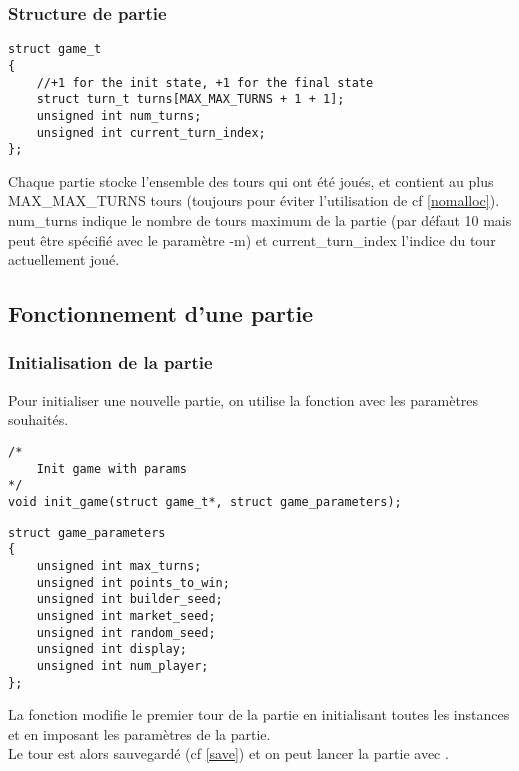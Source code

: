 \subsubsection*{Structure de partie}

\begin{lstlisting}[frame=single, caption={Implémentation de la structure game\_t}]
struct game_t
{
    //+1 for the init state, +1 for the final state
    struct turn_t turns[MAX_MAX_TURNS + 1 + 1]; 
    unsigned int num_turns;
    unsigned int current_turn_index;
};
\end{lstlisting}

Chaque partie stocke l'ensemble des tours qui ont été joués, et contient au plus MAX\_MAX\_TURNS tours (toujours pour éviter l'utilisation de  cf \ref{nomalloc}).\\
num\_turns indique le nombre de tours maximum de la partie (par défaut 10 mais peut être spécifié avec le paramètre -m) et current\_turn\_index l'indice du tour actuellement joué.

\subsection{Fonctionnement d'une partie}

\subsubsection{Initialisation de la partie}
Pour initialiser une nouvelle partie, on utilise la fonction  avec les paramètres souhaités.
\lstset{language=C, style=code}
\begin{lstlisting}[frame=single]
/*
	Init game with params
*/
void init_game(struct game_t*, struct game_parameters);
\end{lstlisting}

\begin{lstlisting}[frame=single, caption={Structure des paramètres de la partie}]
struct game_parameters
{
	unsigned int max_turns;
	unsigned int points_to_win;
	unsigned int builder_seed;
	unsigned int market_seed;
	unsigned int random_seed;
	unsigned int display;
	unsigned int num_player;
};
\end{lstlisting}

La fonction  modifie le premier tour de la partie en initialisant toutes les instances et en imposant les paramètres de la partie.\\
Le tour est alors sauvegardé (cf \ref{save}) et on peut lancer la partie avec .

